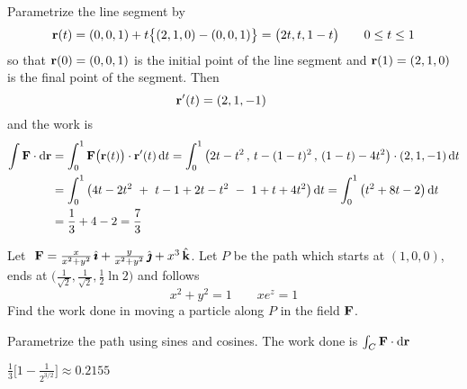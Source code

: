 \begin{solution} 
Parametrize the line segment by
\begin{equation*}
\mathbf{r}(t) = (0,0,1) + t\big\{(2,1,0)-(0,0,1)\big\}
       = \big(2t,t,1-t\big)\qquad
0\le t\le 1
\end{equation*}
so that $\mathbf{r}(0) = (0,0,1)$ is the initial point of the line segment and
$\mathbf{r}(1) = (2,1,0)$ is the final point of the segment. Then
\begin{equation*}
\mathbf{r}'(t) = (2,1,-1)\qquad
\end{equation*}
and the work is
\begin{align*}
\int\mathbf{F}\cdot\mathrm{d}\mathbf{r}
&=\int_0^1 \mathbf{F}\big(\mathbf{r}(t)\big)\cdot \mathbf{r}'(t)\,\mathrm{d}t
=\int_0^1\big(2t-t^2\,,\, t-(1-t)^2 \,,\,(1-t)-4t^2\big)\cdot(2,1,-1)\,\mathrm{d}t
\\
&=\int_0^1\big(4t-2t^2 \ +\ t-1+2t-t^2 \ -\ 1+t+4t^2\big)\,\mathrm{d}t
=\int_0^1\big(t^2+8t-2\big)\,\mathrm{d}t \\
&=\frac{1}{3}+4-2
=\frac{7}{3}
\end{align*}
\end{solution}

\begin{question}[M317 2003A] %
Let $\ \mathbf{F}= \frac{x}{x^2+y^2}\,\hat{\pmb{\imath}}+\frac{y}{x^2+y^2}\,\hat{\pmb{\jmath}}+x^3\,\hat{\mathbf{k}}$. 
Let $P$ be the path which starts at $(1,0,0)$, ends at 
$\big(\frac{1}{\sqrt{2}},\frac{1}{\sqrt{2}},\frac{1}{2}\ln 2\big)$ and follows
\begin{equation*}
x^2+y^2=1\qquad xe^z=1
\end{equation*}
Find the work done in moving a particle along $P$ in the field $\mathbf{F}$.
\end{question}

\begin{hint} 
Parametrize the path using sines and cosines. The work done is $\int_C \mathbf{F} \cdot \mathrm{d}\mathbf{r}$
\end{hint}

\begin{answer} 
$\frac{1}{3}\big[1-\frac{1}{2^{3/2}}\big]\approx 0.2155$
\end{answer}

